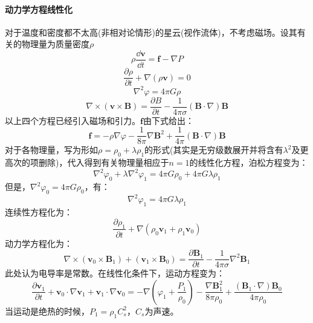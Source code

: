 \paragraph{动力学方程线性化}
对于温度和密度都不太高(非相对论情形)的星云(视作流体)，不考虑磁场。设其有关的物理量为质量密度$\rho$
\begin{equation}
	\rho\frac{\dd \boldsymbol{v}}{\dd t}=\boldsymbol{f}-\nabla P
\end{equation}
\begin{equation}
	\frac{\partial \rho}{\partial t}+\nabla(\rho\boldsymbol{v})=0
\end{equation}
\begin{equation}
	\nabla^2\varphi=4\pi G \rho
\end{equation}
\begin{equation}
	\nabla\times (\boldsymbol{v}\times \boldsymbol{B})=\frac{\partial B}{\partial t}-\frac{1}{4\pi\sigma}(\boldsymbol{B}\cdot\nabla)\boldsymbol{B}
\end{equation}
以上四个方程已经引入磁场和引力。$\boldsymbol{f}$由下式给出：
\begin{equation}
	\boldsymbol{f}=-\rho\nabla\varphi-\frac{1}{8\pi}\nabla\boldsymbol{B}^2+\frac{1}{4\pi}(\boldsymbol{B}\cdot\nabla)\boldsymbol{B}
\end{equation}
对于各物理量，写为形如$\rho=\rho_{0}+\lambda\rho_{1}$的形式(其实是无穷级数展开并将含有$\lambda^2$及更高次的项删除)，代入得到有关物理量相应于$n=1$的线性化方程，泊松方程变为：
\begin{equation}
	\nabla^2\varphi_{0}+\lambda\nabla^2\varphi_{1}=4\pi G\rho_{0}+4\pi G\lambda\rho_{1} 
\end{equation}
但是，$\nabla^2\varphi_{0}=4\pi G\rho_{0}$，有：
\begin{equation}
	\nabla^2\varphi_{1}=4\pi G\lambda\rho_{1} 
\end{equation}
连续性方程化为：
\begin{equation}
	\frac{\partial \rho_{1}}{\partial t}+\nabla(\rho_{0}\boldsymbol{v}_{1}+\rho_{1}\boldsymbol{v}_{0})
\end{equation}
动力学方程化为：
\begin{equation}
	\nabla\times(\boldsymbol{v}_{0}\times \boldsymbol{B}_{1})+(\boldsymbol{v}_{1}\times \boldsymbol{B}_{0})=\frac{\partial \boldsymbol{B}_{1}}{\partial t}-\frac{1}{4\pi\sigma}\nabla^2\boldsymbol{B}_{1}
\end{equation}
此处认为电导率是常数。在线性化条件下，运动方程变为：
\begin{equation}
	\frac{\partial \boldsymbol{v}_{1}}{\partial t}+\boldsymbol{v}_{0}\cdot\nabla\boldsymbol{v}_{1}+\boldsymbol{v}_{1}\cdot\nabla\boldsymbol{v}_{0}=-\nabla\left(\varphi_{1}+\frac{P_{1}}{\rho_{0}}\right)-\frac{\nabla\boldsymbol{B}^2_{1}}{8\pi\rho_{0}}+\frac{(\boldsymbol{B}_{1}\cdot\nabla)\boldsymbol{B}_{0}}{4\pi\rho_{0}}
\end{equation}
当运动是绝热的时候，$P_{1}=\rho_{1}C_{s}^2$，$C_{s}$为声速。
